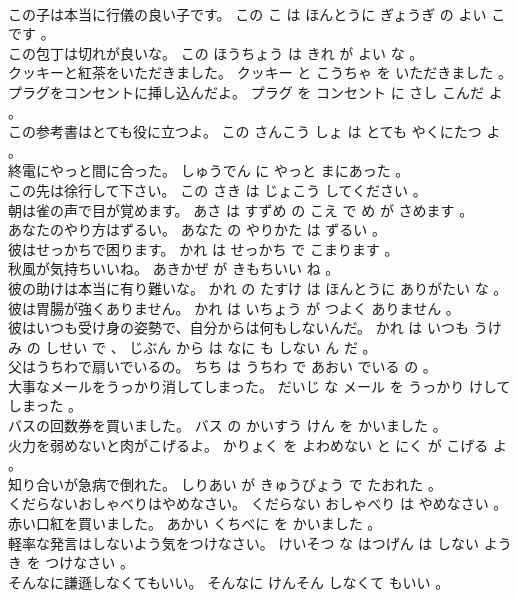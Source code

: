 \documentclass[8pt]{extreport}
\begin{document}
\begin{CJK}{UTF8}{min}
\\	この子は本当に行儀の良い子です。	この こ は ほんとうに ぎょうぎ の よい こ です 。 
\\	この包丁は切れが良いな。	この ほうちょう は きれ が よい な 。 
\\	クッキーと紅茶をいただきました。	クッキー と こうちゃ を いただきました 。 
\\	プラグをコンセントに挿し込んだよ。	プラグ を コンセント に さし こんだ よ 。 
\\	この参考書はとても役に立つよ。	この さんこう しょ は とても やくにたつ よ 。 
\\	終電にやっと間に合った。	しゅうでん に やっと まにあった 。 
\\	この先は徐行して下さい。	この さき は じょこう してください 。 
\\	朝は雀の声で目が覚めます。	あさ は すずめ の こえ で め が さめます 。 
\\	あなたのやり方はずるい。	あなた の やりかた は ずるい 。 
\\	彼はせっかちで困ります。	かれ は せっかち で こまります 。 
\\	秋風が気持ちいいね。	あきかぜ が きもちいい ね 。 
\\	彼の助けは本当に有り難いな。	かれ の たすけ は ほんとうに ありがたい な 。 
\\	彼は胃腸が強くありません。	かれ は いちょう が つよく ありません 。 
\\	彼はいつも受け身の姿勢で、自分からは何もしないんだ。	かれ は いつも うけみ の しせい で 、 じぶん から は なに も しない ん だ 。 
\\	父はうちわで扇いでいるの。	ちち は うちわ で あおい でいる の 。 
\\	大事なメールをうっかり消してしまった。	だいじ な メール を うっかり けしてしまった 。 
\\	バスの回数券を買いました。	バス の かいすう けん を かいました 。 
\\	火力を弱めないと肉がこげるよ。	かりょく を よわめない と にく が こげる よ 。 
\\	知り合いが急病で倒れた。	しりあい が きゅうびょう で たおれた 。 
\\	くだらないおしゃべりはやめなさい。	くだらない おしゃべり は やめなさい 。 
\\	赤い口紅を買いました。	あかい くちべに を かいました 。 
\\	軽率な発言はしないよう気をつけなさい。	けいそつ な はつげん は しない よう き を つけなさい 。 
\\	そんなに謙遜しなくてもいい。	そんなに けんそん しなくて もいい 。 

\end{CJK}
\end{document}
